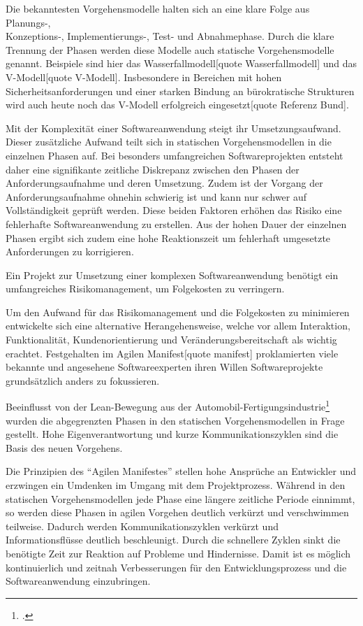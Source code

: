 Die bekanntesten Vorgehensmodelle halten sich an eine klare Folge aus Planungs-,\\ Konzeptions-, Implementierungs-, 
Test- und Abnahmephase. Durch die klare Trennung der Phasen werden diese Modelle auch statische Vorgehensmodelle genannt.
Beispiele sind hier das Wasserfallmodell[quote Wasserfallmodell] und das V-Modell[quote V-Modell]. Insbesondere in
Bereichen mit hohen Sicherheitsanforderungen und einer starken Bindung an bürokratische Strukturen wird auch heute noch
das V-Modell erfolgreich eingesetzt[quote Referenz Bund].

Mit der Komplexität einer Softwareanwendung steigt ihr Umsetzungsaufwand. Dieser zusätzliche Aufwand teilt sich in
statischen Vorgehensmodellen in die einzelnen Phasen auf. Bei besonders umfangreichen Softwareprojekten entsteht daher
eine signifikante zeitliche Diskrepanz zwischen den Phasen der Anforderungsaufnahme und deren Umsetzung. 
Zudem ist der Vorgang der Anforderungsaufnahme ohnehin schwierig ist und kann nur schwer auf Vollständigkeit geprüft
werden. Diese beiden Faktoren erhöhen das Risiko eine fehlerhafte Softwareanwendung zu erstellen. Aus der hohen Dauer der
einzelnen Phasen ergibt sich zudem eine hohe Reaktionszeit um fehlerhaft umgesetzte Anforderungen zu korrigieren.

Ein Projekt zur Umsetzung einer komplexen Softwareanwendung benötigt ein umfangreiches Risikomanagement, um Folgekosten 
zu verringern.

Um den Aufwand für das Risikomanagement und die Folgekosten zu minimieren entwickelte sich eine alternative
Herangehensweise, welche vor allem Interaktion, Funktionalität, Kundenorientierung und Veränderungsbereitschaft als
wichtig erachtet. Festgehalten im Agilen Manifest[quote manifest] proklamierten viele bekannte und angesehene
Softwareexperten ihren Willen Softwareprojekte grundsätzlich anders zu fokussieren.

Beeinflusst von der Lean-Bewegung aus der Automobil-Fertigungsindustrie\footcite{kent1999} wurden die abgegrenzten Phasen 
in den statischen Vorgehensmodellen in Frage gestellt. Hohe Eigenverantwortung und kurze Kommunikationszyklen sind die 
Basis des neuen Vorgehens.

Die Prinzipien des ``Agilen Manifestes'' stellen hohe Ansprüche an Entwickler und erzwingen ein Umdenken im Umgang mit dem Projektprozess. Während in den statischen Vorgehensmodellen jede Phase eine längere zeitliche Periode einnimmt, so werden diese Phasen in agilen Vorgehen deutlich verkürzt und verschwimmen teilweise. Dadurch werden Kommunikationszyklen verkürzt und Informationsflüsse deutlich beschleunigt.
Durch die schnellere Zyklen sinkt die benötigte Zeit zur Reaktion auf Probleme und Hindernisse. Damit ist es möglich kontinuierlich und zeitnah Verbesserungen für den Entwicklungsprozess und die Softwareanwendung einzubringen. 

